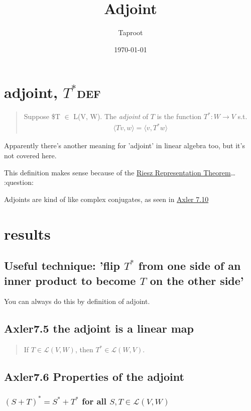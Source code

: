 \documentclass[letterpaper]{article}
\author{Taproot}
\date{\today}
\title{Adjoint}
\renewcommand{\tableofcontents}{}
\begin{document}
\tableofcontents

\section{adjoint, \(T^*\)\hfill{}\textsc{def}}
\label{sec:orge222f6d}
\begin{quote}
Suppose \$T \(\in\) \mathcal L(V, W). The \emph{adjoint} of \(T\) is the function \(T^* : W \to  V\) s.t.
\[\begin{aligned}
   \langle Tv, w \rangle = \langle v, T^* w \rangle
  \end{aligned}\]
\end{quote}
Apparently there's another meaning for 'adjoint' in linear algebra too, but it's not covered here.

This definition makes sense because of the \href{KBrefLinearFunctional.org}{Riesz Representation Theorem}\ldots{} :question:

Adjoints are kind of like complex conjugates, as seen in \href{KBrefConjugateTranspose.org}{Axler 7.10}

\section{results}
\label{sec:orgba8ab94}

\subsection{Useful technique: 'flip \(T^*\) from one side of an inner product to become \(T\) on the other side'}
\label{sec:org230a553}
You can always do this by definition of adjoint.

\subsection{Axler7.5 the adjoint is a linear map}
\label{sec:orga080600}

\begin{quote}
If \(T \in   \mathcal{L} (V, W)\), then \(T^* \in  \mathcal{L} (W, V)\).
\end{quote}

\subsection{Axler7.6 Properties of the adjoint}
\label{sec:org1dd8a2b}

\subsubsection{\((S+T)^* = S^* + T^*\) for all \(S, T \in  \mathcal{L}(V, W)\)}
\label{sec:org0d02586}
\end{document}
